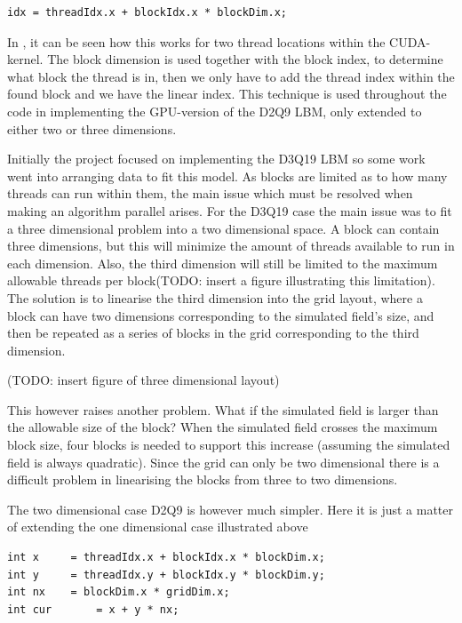\begin{verbatim}
idx = threadIdx.x + blockIdx.x * blockDim.x;
\end{verbatim}

In , it can be seen how this works for two thread locations within the CUDA-kernel. The block dimension is used together with the block index, to determine what block the thread is in, then we only have to add the thread index within the found block and we have the linear index. This technique is used throughout the code in implementing the GPU-version of the D2Q9 LBM, only extended to either two or three dimensions.


Initially the project focused on implementing the D3Q19 LBM so some work went into arranging data to fit this model. As blocks are limited as to how many threads can run within them, the main issue which must be resolved when making an algorithm parallel arises. For the D3Q19 case the main issue was to fit a three dimensional problem into a two dimensional space. A block can contain three dimensions, but this will minimize the amount of threads available to run in each dimension. Also, the third dimension will still be limited to the maximum allowable threads per block(TODO: insert a figure illustrating this limitation). The solution is to linearise the third dimension into the grid layout, where a block can have two dimensions corresponding to the simulated field's size, and then be repeated as a series of blocks in the grid corresponding to the third dimension.

(TODO: insert figure of three dimensional layout)

This however raises another problem. What if the simulated field is larger than the allowable size of the block? When the simulated field crosses the maximum block size, four blocks is needed to support this increase (assuming the simulated field is always quadratic). Since the grid can only be two dimensional there is a difficult problem in linearising the blocks from three to two dimensions.

The two dimensional case D2Q9 is however much simpler. Here it is just a matter of extending the one dimensional case illustrated above

\begin{verbatim}
int x     = threadIdx.x + blockIdx.x * blockDim.x;
int y     = threadIdx.y + blockIdx.y * blockDim.y;
int nx    = blockDim.x * gridDim.x;
int cur 	  = x + y * nx;
\end{verbatim}

